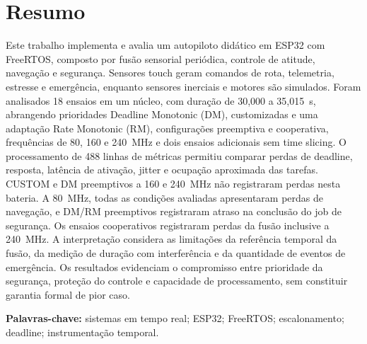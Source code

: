 \section*{Resumo}
Este trabalho implementa e avalia um autopiloto didático em ESP32 com FreeRTOS, composto por fusão sensorial periódica, controle de atitude, navegação e segurança. Sensores touch geram comandos de rota, telemetria, estresse e emergência, enquanto sensores inerciais e motores são simulados. Foram analisados 18 ensaios em um núcleo, com duração de 30,000 a 35,015~s, abrangendo prioridades Deadline Monotonic (DM), customizadas e uma adaptação Rate Monotonic (RM), configurações preemptiva e cooperativa, frequências de 80, 160 e 240~MHz e dois ensaios adicionais sem time slicing. O processamento de 488 linhas de métricas permitiu comparar perdas de deadline, resposta, latência de ativação, jitter e ocupação aproximada das tarefas. CUSTOM e DM preemptivos a 160 e 240~MHz não registraram perdas nesta bateria. A 80~MHz, todas as condições avaliadas apresentaram perdas de navegação, e DM/RM preemptivos registraram atraso na conclusão do job de segurança. Os ensaios cooperativos registraram perdas da fusão inclusive a 240~MHz. A interpretação considera as limitações da referência temporal da fusão, da medição de duração com interferência e da quantidade de eventos de emergência. Os resultados evidenciam o compromisso entre prioridade da segurança, proteção do controle e capacidade de processamento, sem constituir garantia formal de pior caso.

\noindent\textbf{Palavras-chave:} sistemas em tempo real; ESP32; FreeRTOS; escalonamento; deadline; instrumentação temporal.
\clearpage
